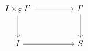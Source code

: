 \[\begin{tikzcd}[column sep=huge,row sep=large]
I\times_S I' \arrow[r] \arrow[d] & I' \arrow[d]\\
I \arrow[r] & S
\end{tikzcd}\]
